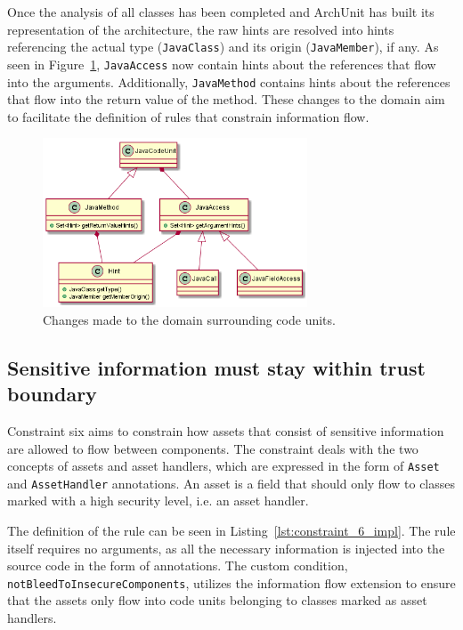 Once the analysis of all classes has been completed and ArchUnit has built its representation of the architecture, the raw hints are resolved into hints referencing the actual type (\texttt{JavaClass}) and its origin (\texttt{JavaMember}), if any. As seen in Figure~\ref{fig:domain_changes_1}, \texttt{JavaAccess} now contain hints about the references that flow into the arguments. Additionally, \texttt{JavaMethod} contains hints about the references that flow into the return value of the method. These changes to the domain aim to facilitate the definition of rules that constrain information flow.

\begin{figure}
    \centering
    \includegraphics[width=0.7\textwidth]{figure/extension/DomainChanges1.png}
    \caption{Changes made to the domain surrounding code units.}
    \label{fig:domain_changes_1}
\end{figure}

\subsection{Sensitive information must stay within trust boundary}
Constraint six aims to constrain how assets that consist of sensitive information are allowed to flow between components. The constraint deals with the two concepts of assets and asset handlers, which are expressed in the form of \texttt{Asset} and \texttt{AssetHandler} annotations. An asset is a field that should only flow to classes marked with a high security level, i.e. an asset handler.

The definition of the rule can be seen in Listing~\ref{lst:constraint_6_impl}. The rule itself requires no arguments, as all the necessary information is injected into the source code in the form of annotations. The custom condition, \texttt{notBleedToInsecureComponents}, utilizes the information flow extension to ensure that the assets only flow into code units belonging to classes marked as asset handlers.

